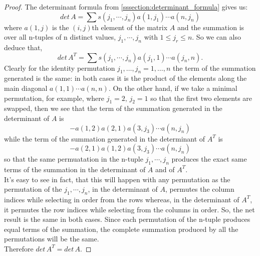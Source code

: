\documentclass[../MathsNotesBase.tex]{subfiles}
\begin{document}
{		\bigskip
		\begin{proof}
			The determinant formula from \ref{sssection:determinant_formula} gives us:
			\[ det\, A = \sum s(j_1,\cdots,j_n)a(1,j_1) \cdots a(n,j_n) \]
			where $a(1,j)$ is the $(i,j)$th element of the matrix $A$ and the summation is over all n-tuples of n distinct values, $j_1, \cdots, j_n$ with ${1 \leq j_r \leq n}$. So we can also deduce that,
			\[ det\, A^T = \sum s(j_1,\cdots,j_n)a(j_1,1) \cdots a(j_n,n). \]
			Clearly for the identity permutation ${ j_1,\dots,j_n = 1,\dots,n }$ the term of the summation generated is the same: in both cases it is the product of the elements along the main diagonal ${ a(1,1)\cdots a(n,n) }$. On the other hand, if we take a minimal permutation, for example, where ${ j_1 = 2,\, j_2 = 1 }$ so that the first two elements are swapped, then we see that the term of the summation generated in the determinant of $A$ is
			\[ -a(1,2)a(2,1)a(3,j_3) \cdots a(n,j_n) \]
			while the term of the summation generated in the determinant of $A^T$ is
			\[ -a(2,1)a(1,2)a(3,j_3) \cdots a(n,j_n) \]
			so that the same permuatation in the n-tuple $j_1, \cdots, j_n$ produces the exact same terms of the summation in the determinant of $A$ and of $A^T$.\\
			It's easy to see in fact, that this will happen with any permutation as the permutation of the $j_1, \cdots, j_n$, in the determinant of $A$, permutes the column indices while selecting in order from the rows whereas, in the determinant of $A^T$, it permutes the row indices while selecting from the columns in order. So, the net result is the same in both cases. Since each permutation of the n-tuple produces equal terms of the summation, the complete summation produced by all the permutations will be the same.\\
			Therefore ${ det\,A^T = det\,A. }$
		\end{proof}
	}
\end{document}
